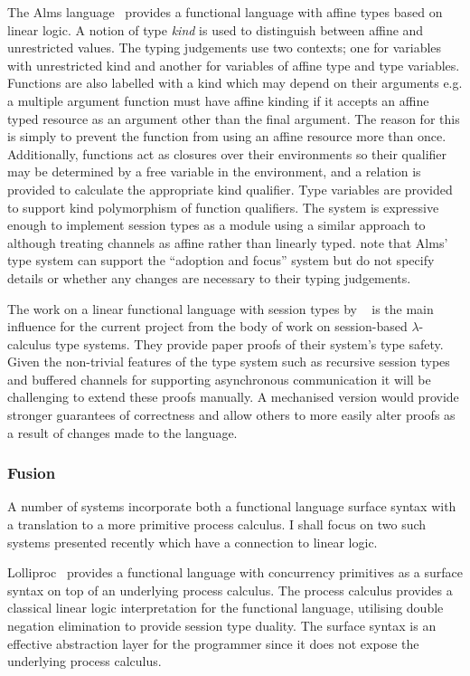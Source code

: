 The Alms language~\cite{Aldrich:2009} provides a functional language with
affine types based on linear logic. A notion of type \textit{kind} is used to
distinguish between affine and unrestricted values. The typing judgements use
two contexts; one for variables with unrestricted kind and another for
variables of affine type and type variables. Functions are also labelled with
a kind which may depend on their arguments e.g. a multiple argument function
must have affine kinding if it accepts an affine typed resource as an argument
other than the final argument. The reason for this is simply to prevent the
function from using an affine resource more than once. Additionally, functions
act as closures over their environments so their qualifier may be determined
by a free variable in the environment, and a relation is provided to calculate
the appropriate kind qualifier. Type variables are provided to support kind
polymorphism of function qualifiers. The system is expressive enough to
implement session types as a module using a similar approach to
\citeauthor{Gay:2010:LAST}~\cite{Gay:2010:LAST} although treating channels as
affine rather than linearly typed. \citeauthor{Aldrich:2009} note that Alms'
type system can support the ``adoption and focus'' system but do not specify
details or whether any changes are necessary to their typing judgements.

The work on a linear functional language with session types by
\citeauthor{Gay:2010:LAST}~\cite{Gay:2010:LAST} is the main influence for the
current project from the body of work on session-based $\lambda$-calculus type
systems. They provide paper proofs of their system's type safety. Given the
non-trivial features of the type system such as recursive session types and
buffered channels for supporting asynchronous communication it will be
challenging to extend these proofs manually. A mechanised version would
provide stronger guarantees of correctness and allow others to more easily
alter proofs as a result of changes made to the language.

\subsubsection{Fusion}

A number of systems incorporate both a functional language surface syntax with
a translation to a more primitive process calculus. I shall focus on two such
systems presented recently which have a connection to linear logic.

Lolliproc~\cite{Mazurak:2010:LCC} provides a functional language with
concurrency primitives as a surface syntax on top of an underlying process
calculus. The process calculus provides a classical linear logic
interpretation for the functional language, utilising double negation
elimination to provide session type duality. The surface syntax is an
effective abstraction layer for the programmer since it does not expose the
underlying process calculus.

